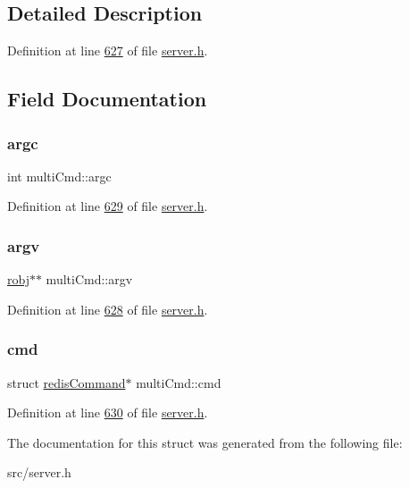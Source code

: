\subsection{Detailed Description}


Definition at line \hyperlink{server_8h_source_l00627}{627} of file \hyperlink{server_8h_source}{server.\+h}.



\subsection{Field Documentation}
\mbox{\label{structmultiCmd_af4ce1743e1f985dded2143cb89b9614d}} 
\subsubsection{\texorpdfstring{argc}{argc}}
{\footnotesize\ttfamily int multi\+Cmd\+::argc}



Definition at line \hyperlink{server_8h_source_l00629}{629} of file \hyperlink{server_8h_source}{server.\+h}.

\mbox{\label{structmultiCmd_a4504f1b95d493e4ea414629843281b9d}} 
\subsubsection{\texorpdfstring{argv}{argv}}
{\footnotesize\ttfamily \hyperlink{structredisObject}{robj}$\ast$$\ast$ multi\+Cmd\+::argv}



Definition at line \hyperlink{server_8h_source_l00628}{628} of file \hyperlink{server_8h_source}{server.\+h}.

\mbox{\label{structmultiCmd_a0f38052708e902f90c9ea505a02dd834}} 
\subsubsection{\texorpdfstring{cmd}{cmd}}
{\footnotesize\ttfamily struct \hyperlink{structredisCommand}{redis\+Command}$\ast$ multi\+Cmd\+::cmd}



Definition at line \hyperlink{server_8h_source_l00630}{630} of file \hyperlink{server_8h_source}{server.\+h}.



The documentation for this struct was generated from the following file\+:\begin{DoxyCompactItemize}
\item 
src/server.\+h\end{DoxyCompactItemize}
